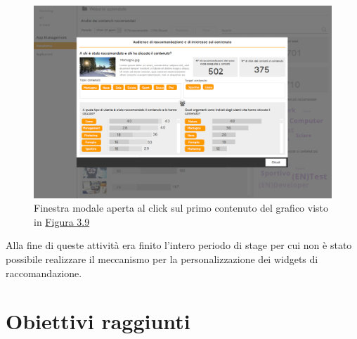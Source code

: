 \documentclass[a4paper, 12pt, twoside, openright]{book}
\begin{document}
\begin{figure}[H]
	\centering
	\label{grafico-qualitativo-2}
	\includegraphics[width=1.0\textwidth]{images/grafico-qualitativo-2.jpg}
	\caption{Finestra modale aperta al click sul primo contenuto del grafico visto in \hyperref[grafico-qualitativo-1]{Figura 3.9}}
\end{figure}
Alla fine di queste attività era finito l'intero periodo di stage per cui non è stato possibile realizzare il meccanismo per la personalizzazione dei widgets di raccomandazione.

\section{Obiettivi raggiunti}
\end{document}
